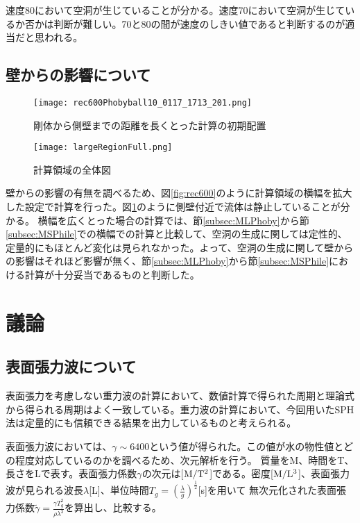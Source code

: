 \documentclass[]{jsarticle}
\begin{document}
速度80において空洞が生じていることが分かる。速度70において空洞が生じているか否かは判断が難しい。70と80の間が速度のしきい値であると判断するのが適当だと思われる。

\subsection{壁からの影響について}
\label{subsec:wall}
\begin{figure}[H]
  \centering
  \begin{minipage}{0.5\columnwidth}
    \centering
    \texttt{[image: rec600Phobyball10\_0117\_1713\_201.png]}
    \caption{剛体から側壁までの距離を長くとった計算の初期配置
      \label{fig:rec600} }
    \end{minipage}
    \begin{minipage}{0.5\columnwidth}
    \centering
    \texttt{[image: largeRegionFull.png]}
    \caption{計算領域の全体図\label{fig:largeRegionFull}}
  \end{minipage}
\end{figure}

壁からの影響の有無を調べるため、図\ref{fig:rec600}のように計算領域の横幅を拡大した設定で計算を行った。図\ref{fig:largeRegionFull}のように側壁付近で流体は静止していることが分かる。
横幅を広くとった場合の計算では、節\ref{subsec:MLPhoby}から節\ref{subsec:MSPhile}での横幅での計算と比較して、空洞の生成に関しては定性的、定量的にもほとんど変化は見られなかった。よって、空洞の生成に関して壁からの影響はそれほど影響が無く、節\ref{subsec:MLPhoby}から節\ref{subsec:MSPhile}における計算が十分妥当であるものと判断した。

\newpage
\section{議論}
\subsection{表面張力波について}
\label{subsec:discSurfWave}
表面張力を考慮しない重力波の計算において、数値計算で得られた周期と理論式から得られる周期はよく一致している。重力波の計算において、今回用いたSPH法は定量的にも信頼できる結果を出力しているものと考えられる。

表面張力波においては、$\gamma\sim 6400$という値が得られた。この値が水の物性値とどの程度対応しているのかを調べるため、次元解析を行う。
質量をM、時間をT、長さをLで表す。表面張力係数$\gamma$の次元は[$\rm{M/T^2}$]である。密度[$\rm{M/L^3}$]、表面張力波が見られる波長$\lambda$[L]、単位時間$T_g=(\frac{\lambda}{g})^{\frac{1}{2}}$[s]を用いて
無次元化された表面張力係数$\tilde{\gamma}=\frac{\gamma T_g^2}{\rho \lambda^3}$を算出し、比較する。
\end{document}
